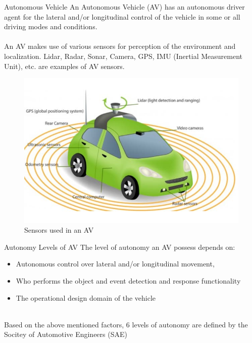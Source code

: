 \documentclass{beamer}
\begin{document}
\begin{frame}{Autonomous Vehicle}
	An Autonomous Vehicle (AV) has an autonomous driver agent for the lateral and/or longitudinal control of the vehicle in some or all driving modes and conditions.\\~\\
	An AV makes use of various sensors for perception of the environment and localization. Lidar, Radar, Sonar, Camera, GPS, IMU (Inertial Measurement Unit), etc. are examples of AV sensors.
	\begin{figure}
		\centering
		\includegraphics[scale = 0.25]{figures/AV sensors image coutsey_engineering}
		\caption{Sensors used in an AV}
		\label{avsensors}
	\end{figure}
\end{frame}
\begin{frame}{Autonomy Levels of AV}
	The level of autonomy an AV possess depends on:
	\begin{itemize} 
		\item Autonomous control over lateral and/or longitudinal movement,
		\item Who performs the object and event detection and response functionality
		\item The operational design domain of the vehicle\\~\\
		\end{itemize}
	Based on the above mentioned factors, 6 levels of autonomy are defined by the Socitey of Automotive Engineers (SAE) \footnotemark
\end{frame}
\end{document}
